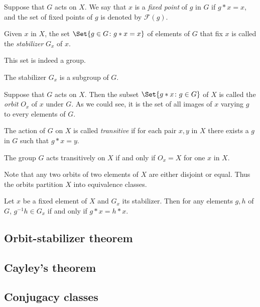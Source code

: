 \documentclass[main.tex]{subfiles}
\begin{document}
			\begin{definition}
				Suppose that $G$ acts on $X$. We say that $x$ is a \textit{fixed point}  of $g$ in $G$ if $g\ast x = x$, and the set of fixed points of $g$ is denoted by $\mathcal{F}(g)$.
			\end{definition}
			\begin{definition}
				Given $x$ in $X$, the set $\Set{g \in G \colon g\ast x = x}$ of elements of $G$ that fix $x$ is called the \textit{stabilizer}  $G_x$ of $x$.
			\end{definition}
			This set is indeed a group.
			\begin{theorem}
				The stabilizer $G_x$ is a subgroup of $G$.
			\end{theorem}
			\begin{definition}
				Suppose that $G$ acts on $X$. Then the subset $\Set{g\ast x \colon g \in G}$ of $X$ is called the \textit{orbit}  $O_x$ of $x$ under $G$. As we could see, it is the set of all images of $x$ varying $g$ to every elements of $G$.
			\end{definition}
			\begin{definition}
				The action of $G$ on $X$ is called \textit{transitive} if for each pair $x, y$ in $X$ there exists a $g$ in $G$ such that $g\ast x = y$.
			\end{definition}
			\begin{lemma}
				The group $G$ acts transitively on $X$ if and only if $O_x = X$	for one $x$ in $X$.	
			\end{lemma}
			Note that any two orbits of two elements of $X$ are either disjoint or equal. Thus the orbits partition $X$ into equivalence classes.
			
			\begin{lemma}
				Let $x$ be a fixed element of $X$ and $G_x$ its stabilizer. Then for any elements $g, h$ of $G$, $g^{-1}h \in G_x$ if and only if $g\ast x = h \ast x$.
			\end{lemma}
			\subsection{Orbit-stabilizer theorem}
			
			\subsection{Cayley's theorem}
			
			\subsection{Conjugacy classes}
			
\end{document}
